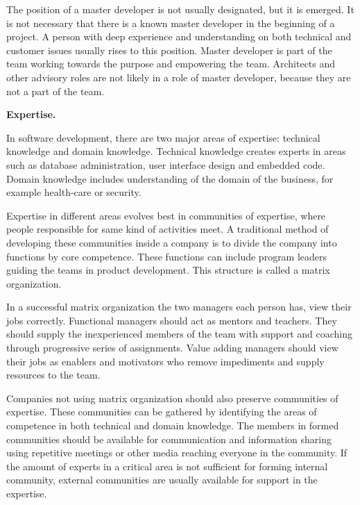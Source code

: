 The position of a master developer is not usually designated, but it is emerged. It is not necessary that there is a known master developer in the beginning of a project. A person with deep experience and understanding on both technical and customer issues usually rises to this position. Master developer is part of the team working towards the purpose and empowering the team. Architects and other advisory roles are not likely in a role of master developer, because they are not a part of the team.

\textbf{Expertise.}

In software development, there are two major areas of expertise: technical knowledge and domain knowledge. Technical knowledge creates experts in areas such as database administration, user interface design and embedded code. Domain knowledge includes understanding of the domain of the business, for example health-care or security.

Expertise in different areas evolves best in communities of expertise, where people responsible for same kind of activities meet. A traditional method of developing these communities inside a company is to divide the company into functions by core competence. These functions can include program leaders guiding the teams in product development. This structure is called a matrix organization.

In a successful matrix organization the two managers each person has, view their jobs correctly. Functional managers should act as mentors and teachers. They should supply the inexperienced members of the team with support and coaching through progressive series of assignments. Value adding managers should view their jobs as enablers and motivators who remove impediments and supply resources to the team.

Companies not using matrix organization should also preserve communities of expertise. These communities can be gathered by identifying the areas of competence in both technical and domain knowledge. The members in formed communities should be available for communication and information sharing using repetitive meetings or other media reaching everyone in the community. If the amount of experts in a critical area is not sufficient for forming internal community, external communities are usually available for support in the expertise.


